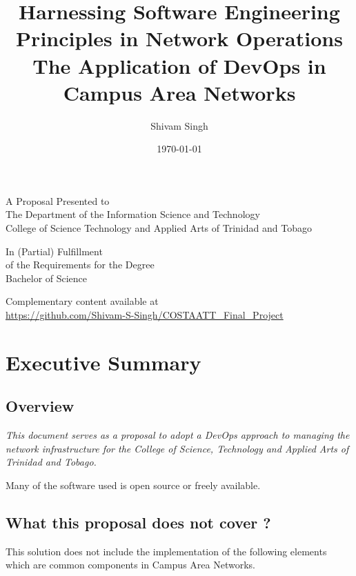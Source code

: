 \documentclass[12pt, letterpaper]{article}
\begin{document}
\title{Harnessing Software Engineering Principles in Network Operations \\
\vspace{0.5cm}
\large The Application of DevOps in Campus Area Networks}
\author{Shivam Singh}
\date{\today}
\maketitle

\vspace{1cm}

\begin{center}

A Proposal Presented to\\ 
The Department of the Information Science and Technology\\
College of Science Technology and Applied Arts of Trinidad and Tobago 

\vspace{1cm}

In (Partial) Fulfillment\\
of the Requirements for the Degree\\
Bachelor of Science

\vspace{1cm}

Complementary content available at \\
\url{https://github.com/Shivam-S-Singh/COSTAATT_Final_Project}


\end{center}

\newpage

\tableofcontents

\newpage

\section{Executive Summary}
	\subsection{Overview}
\begin{center}
\textit{This document serves as a proposal to adopt a DevOps approach to managing the network infrastructure for the College of Science, Technology and Applied Arts of Trinidad and Tobago.}
\end{center}


Many of the software used is open source or freely available.

	\subsection{What this proposal does not cover ?}
This solution does not include the implementation of the following elements which are common components in Campus Area Networks.
\end{document}
